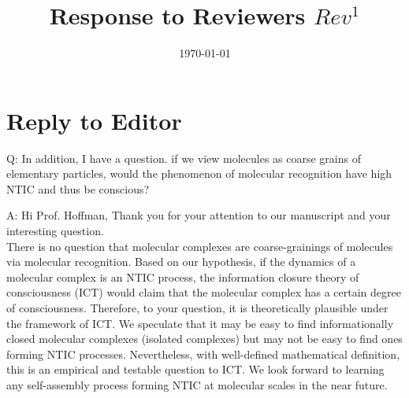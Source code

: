 \documentclass[utf8]{article}
\title{Response to Reviewers $Rev^1$}
\date{\today}
\author{}
\newcounter{cQuestion}[section]
\newenvironment{question}
    {\refstepcounter{cQuestion}\color{Blue}\noindent\newline Q\thecQuestion:}
    {~\newline}
\newenvironment{ans}  
    {\color{Black}\noindent A:}
    {~\newline}
\begin{document}
    \maketitle
    \section*{Reply to Editor}
        \begin{question}
        In addition, I have a question. if we view molecules as coarse grains of elementary particles, would the phenomenon of molecular recognition have high NTIC and thus be conscious?
        \end{question}
        
        \begin{ans}
            Hi Prof. Hoffman,
            Thank you for your attention to our manuscript and your interesting question. \\
            There is no question that molecular complexes are coarse-grainings of molecules via molecular recognition. Based on our hypothesis, if the dynamics of a molecular complex is an NTIC process, the information closure theory of consciousness (ICT) would claim that the molecular complex has a certain degree of consciousness. Therefore, to your question, it is theoretically plausible under the framework of ICT. We speculate that it may be easy to find informationally closed molecular complexes (isolated complexes) but may not be easy to find ones forming NTIC processes. Nevertheless, with well-defined mathematical definition, this is an empirical and testable question to ICT. We look forward to learning any self-assembly process forming NTIC at molecular scales in the near future.        
        \end{ans}
        
    
\end{document}
